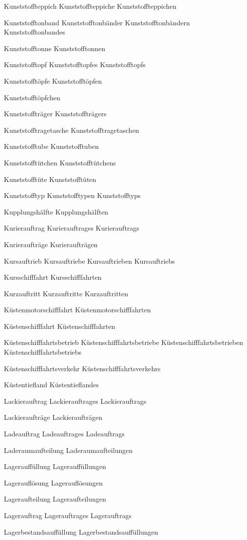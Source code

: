 Kunststoffteppich
Kunststoffteppiche
Kunststoffteppichen

Kunststofftonband
Kunststofftonbänder
Kunststofftonbändern
Kunststofftonbandes

Kunststofftonne
Kunststofftonnen

Kunststofftopf
Kunststofftopfes
Kunststofftopfs

Kunststofftöpfe
Kunststofftöpfen

Kunststofftöpfchen

Kunststoffträger
Kunststoffträgers

Kunststofftragetasche
Kunststofftragetaschen

Kunststofftube
Kunststofftuben

Kunststofftütchen
Kunststofftütchens

Kunststofftüte
Kunststofftüten

Kunststofftyp
Kunststofftypen
Kunststofftyps

Kupplungshälfte
Kupplungshälften

Kurierauftrag
Kurierauftrages
Kurierauftrags

Kurieraufträge
Kurieraufträgen

Kursauftrieb
Kursauftriebe
Kursauftrieben
Kursauftriebs

Kursschifffahrt
Kursschifffahrten

Kurzauftritt
Kurzauftritte
Kurzauftritten

Küstenmotorschifffahrt
Küstenmotorschifffahrten

Küstenschifffahrt
Küstenschifffahrten

Küstenschifffahrtsbetrieb
Küstenschifffahrtsbetriebe
Küstenschifffahrtsbetrieben
Küstenschifffahrtsbetriebs

Küstenschifffahrtsverkehr
Küstenschifffahrtsverkehrs

Küstentiefland
Küstentieflandes

Lackierauftrag
Lackierauftrages
Lackierauftrags

Lackieraufträge
Lackieraufträgen

Ladeauftrag
Ladeauftrages
Ladeauftrags

Laderaumaufteilung
Laderaumaufteilungen

Lagerauffüllung
Lagerauffüllungen

Lagerauflösung
Lagerauflösungen

Lageraufteilung
Lageraufteilungen

Lagerauftrag
Lagerauftrages
Lagerauftrags

Lagerbestandsauffüllung
Lagerbestandsauffüllungen

